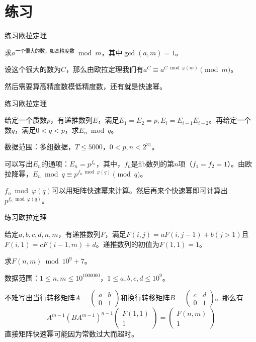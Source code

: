 \documentclass{ctexbeamer}        %
\begin{document}
\section{练习}

\begin{frame}{练习}{欧拉定理}

\begin{example}[欧拉降幂]
	求$a^{\text{一个很大的数，如高精度数}} \bmod m$，其中$\gcd(a,m)=1$。
\end{example}
\pause
设这个很大的数为$C$，那么由欧拉定理我们有$a^C \equiv a^{C \bmod \varphi(m)} \pmod m$。

然后需要算高精度数模低精度数，还有就是快速幂。

\end{frame}

\begin{frame}{练习}{欧拉定理}

\begin{example}[accoders 9952]
	给定一个质数$p$，有递推数列$E$，满足$E_1=E_2=p,E_i=E_{i-1}E_{i-2}$。再给定一个数$q$，满足$0<q<p$，求$E_n \bmod q$。

	数据范围：多组数据，$T\le 5000$，$0<p,n<2^{31}$。
\end{example}
\pause
可以写出$E_n$的通项：$E_n=p^{f_n}$，其中，$f_n$是fib数列的第$n$项（$f_1=f_2=1$）。由欧拉降幂，$E_n \bmod q \equiv p^{f_n \bmod \varphi(q)} \pmod q$。

$f_n \bmod \varphi(q)$可以用矩阵快速幂来计算。然后再来个快速幂即可计算出$p^{f_n \bmod \varphi(q)}$。

\end{frame}

\begin{frame}{练习}{欧拉定理}

\begin{example}[accoders 6095]
	给定$a,b,c,d,n,m$，有递推数列$F$，满足$F(i,j)=aF(i,j-1)+b(j>1)$且$F(i,1)=cF(i-1,m)+d$。递推数列的初值为$F(1,1)=1$。

	求$F(n,m) \bmod 10^9+7$。

	数据范围：$1\le n,m \le 10^{1000000}$，$1\le a,b,c,d \le 10^9$。
\end{example}
\pause
不难写出当行转移矩阵$A=\begin{pmatrix} a & b \\ 0 & 1 \end{pmatrix}$和换行转移矩阵$B=\begin{pmatrix} c & d \\ 0 & 1 \end{pmatrix}$。那么有
$$A^{m-1}(BA^{m-1})^{n-1}\begin{pmatrix} F(1,1) \\ 1 \end{pmatrix} = \begin{pmatrix} F(n,m) \\ 1 \end{pmatrix}$$
直接矩阵快速幂可能因为常数过大而超时。

\end{frame}
\end{document}

